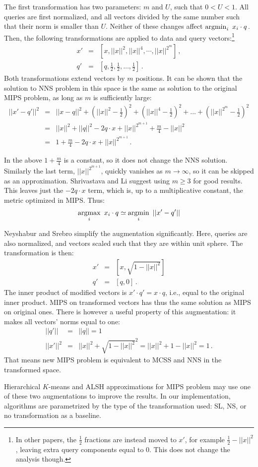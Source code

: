 The first transformation has two parameters: $m$ and $U$, such that $0 < U < 1$. All queries
are first normalized, and all vectors divided by the same number such that
their norm is smaller than $U$. Neither of these changes affect
$ \argmin_{i}\ x_i \cdot q\,.$
Then, the following transformations are applied to data
and query vectors:\footnote{In other papers, the $\frac{1}{2}$ fractions are
instead moved to $x'$, for example $\frac{1}{2} - ||x||^2$, leaving extra
query components equal to 0. This does not change the analysis though.}
\begin{eqnarray*}
x' & = & [x, ||x||^2, ||x||^4, \cdots, ||x||^{2^m}] \,, \\
q' & = & [q, \frac{1}{2}, \frac{1}{2}, \dots, \frac{1}{2}] \,. 
\end{eqnarray*}
Both transformations extend vectors by $m$ positions. It can be shown that
the solution to NNS problem in this space is the same as solution to the original
MIPS problem, as long as $m$ is sufficiently large:
\begin{eqnarray*}
||x' - q'||^2 & = & ||x - q||^2 +
\left (||x||^2 - \frac{1}{2} \right )^2 + \left (||x||^4 - \frac{1}{2} \right )^2 + \dots + 
\left (||x||^{2^m} - \frac{1}{2} \right )^2 \\
& = & ||x||^2 + ||q||^2 - 2 q \cdot x + ||x||^{2^{m+1}} + \frac{m}{4} - ||x||^2 \\
& = & 1 + \frac{m}{4} - 2 q \cdot x + ||x||^{2^{m+1}} \,.
\end{eqnarray*}

In the above $1 + \frac{m}{4} $ is a constant, so it does not change the NNS solution. Similarly  the last term, 
$||x||^{2^{m+1}}$, quickly vanishes as $m \to \infty$, so it can be skipped
as an approximation. Shrivastava and Li suggest using $m \ge 3$ for good results.
This leaves just the $ - 2 q \cdot x $ term, which is, up to a multiplicative
constant, the metric optimized in MIPS.
Thus:
$$
\operatorname*{argmax}_{i}\ x_i \cdot q \simeq \operatorname*{argmin}_{i}\ ||x' - q'||
$$

Neyshabur and Srebro simplify the augmentation significantly. Here, queries are also
normalized, and vectors scaled such that they are within unit sphere. The
transformation is then:
\begin{eqnarray*}
x' & = & [x, \sqrt{1 - ||x||^2}] \\
q' & = &  [q, 0] \,.
\end{eqnarray*}
The inner product of modified vectors is $x' \cdot q' = x \cdot q$, i.e., equal
to the original inner product. MIPS on transformed vectors has thus the same
solution as MIPS on original ones. There is however a useful property of this
augmentation: it makes all vectors' norms equal to one: 
\begin{eqnarray*}
||q'|| & = & ||q|| = 1 \\
||x'||^2 & = & ||x||^2 + \sqrt{1 - ||x||^2}^2 = ||x||^2 + 1 - ||x||^2 = 1 \,. 
\end{eqnarray*}
That means new MIPS problem is equivalent to MCSS and NNS in the transformed
space.

Hierarchical $K$-means and ALSH approximations for MIPS problem may use one
of these two augmentations to improve the results. In our implementation,
algorithms are parametrized by the type of the transformation used: SL, NS,
or no transformation as a baseline.
